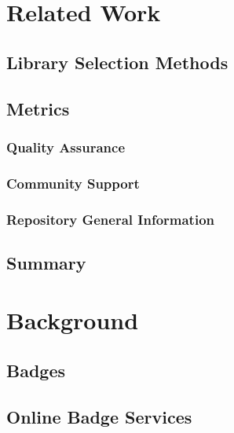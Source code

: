 \documentclass[12pt, letterpaper]{article}
\begin{document}
\section{Related Work}
\subsection{Library Selection Methods}

\subsection{Metrics}
\subsubsection{Quality Assurance}

\subsubsection{Community Support}

\subsubsection{Repository General Information}

\subsection{Summary}

\section{Background}

\subsection{Badges}
\subsection{Online Badge Services}
\end{document}
